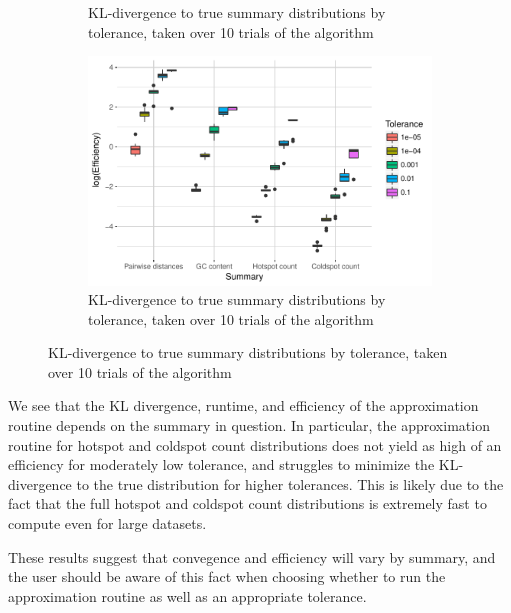 \documentclass{article}
\begin{document}
\begin{figure}
\begin{subfigure}{0.5\textwidth}
        \caption{KL-divergence to true summary distributions by tolerance, taken over 10 trials of the algorithm}
        \label{fig:TimeBySummary}
    \end{subfigure}
    \begin{subfigure}{0.5\textwidth}
        \includegraphics[width=\linewidth]{Figures/Multiple/efficiency_by_summary_and_tol.pdf}
        \caption{KL-divergence to true summary distributions by tolerance, taken over 10 trials of the algorithm}
        \label{fig:EfficiencyBySummary}
    \end{subfigure}
\end{figure}
We see that the KL divergence, runtime, and efficiency of the approximation routine depends on the summary in question.
In particular, the approximation routine for hotspot and coldspot count distributions does not yield as high of an efficiency for moderately low tolerance, and struggles to minimize the KL-divergence to the true distribution for higher tolerances.
This is likely due to the fact that the full hotspot and coldspot count distributions is extremely fast to compute even for large datasets.

These results suggest that convegence and efficiency will vary by summary, and the user should be aware of this fact when choosing whether to run the approximation routine as well as an appropriate tolerance.
\end{document}
